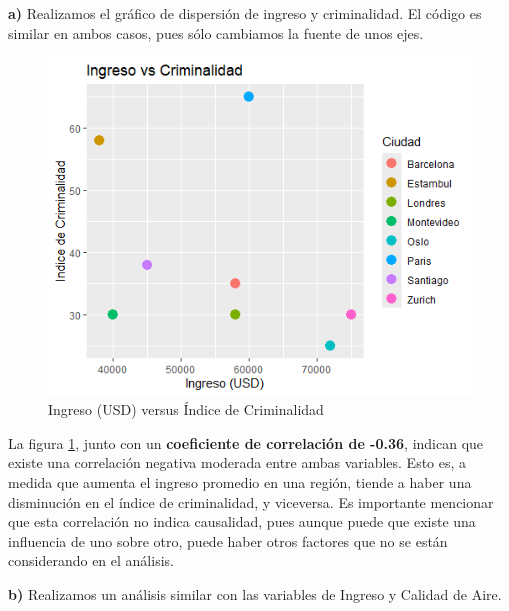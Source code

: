 \documentclass{article}
\begin{document}
\textbf{a) } Realizamos el gráfico de dispersión de ingreso y criminalidad. El código es similar en ambos casos, pues sólo cambiamos la fuente de unos ejes.

\begin{figure}[h!]
    \centering
    \includegraphics[scale = 0.7]{Tarea_1_2apng.png}
    \caption{Ingreso (USD) versus Índice de Criminalidad}
    \label{fig:enter-label}
\end{figure}

La figura \ref{fig:enter-label}, junto con un \textbf{coeficiente de correlación de -0.36}, indican que existe una correlación negativa moderada entre ambas variables. Esto es, a medida que aumenta el ingreso promedio en una región, tiende a haber una disminución en el índice de criminalidad, y viceversa. Es importante mencionar que esta correlación no indica causalidad, pues aunque puede que existe una influencia de uno sobre otro, puede haber otros factores que no se están considerando en el análisis.

\newpage

\textbf{b) } Realizamos un análisis similar con las variables de Ingreso y Calidad de Aire.
\end{document}
